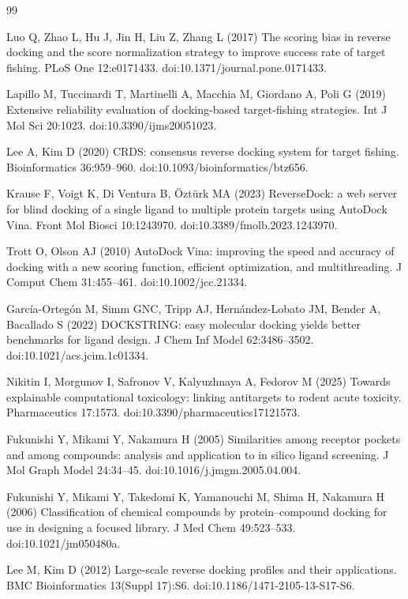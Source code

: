 \begin{thebibliography}{99}
\small

 Luo Q, Zhao L, Hu J, Jin H, Liu Z, Zhang L (2017) The scoring
bias in reverse docking and the score normalization strategy to improve success
rate of target fishing. PLoS One 12:e0171433.
doi:10.1371/journal.pone.0171433.

 Lapillo M, Tuccinardi T, Martinelli A, Macchia M,
Giordano A, Poli G (2019) Extensive reliability evaluation of docking-based
target-fishing strategies. Int J Mol Sci 20:1023.
doi:10.3390/ijms20051023.

 Lee A, Kim D (2020) CRDS: consensus reverse docking system
for target fishing. Bioinformatics 36:959--960.
doi:10.1093/bioinformatics/btz656.

 Krause F, Voigt K, Di Ventura B, {\"O}zt{\"u}rk MA (2023)
ReverseDock: a web server for blind docking of a single ligand to multiple
protein targets using AutoDock Vina. Front Mol Biosci 10:1243970.
doi:10.3389/fmolb.2023.1243970.

 Trott O, Olson AJ (2010) AutoDock Vina: improving the speed and
accuracy of docking with a new scoring function, efficient optimization, and
multithreading. J Comput Chem 31:455--461. doi:10.1002/jcc.21334.

 Garc\'ia-Orteg\'on M, Simm GNC, Tripp AJ,
Hern\'andez-Lobato JM, Bender A, Bacallado S (2022) DOCKSTRING: easy molecular
docking yields better benchmarks for ligand design. J Chem Inf Model
62:3486--3502. doi:10.1021/acs.jcim.1c01334.

 Nikitin I, Morgunov I, Safronov V, Kalyuzhnaya A,
Fedorov M (2025) Towards explainable computational toxicology: linking
antitargets to rodent acute toxicity. Pharmaceutics 17:1573.
doi:10.3390/pharmaceutics17121573.

 Fukunishi Y, Mikami Y, Nakamura H (2005) Similarities
among receptor pockets and among compounds: analysis and application to
in silico ligand screening. J Mol Graph Model 24:34--45.
doi:10.1016/j.jmgm.2005.04.004.

 Fukunishi Y, Mikami Y, Takedomi K, Yamanouchi M,
Shima H, Nakamura H (2006) Classification of chemical compounds by
protein--compound docking for use in designing a focused library. J Med Chem
49:523--533. doi:10.1021/jm050480a.

 Lee M, Kim D (2012) Large-scale reverse docking
profiles and their applications. BMC Bioinformatics 13(Suppl 17):S6.
doi:10.1186/1471-2105-13-S17-S6.


\end{thebibliography}
